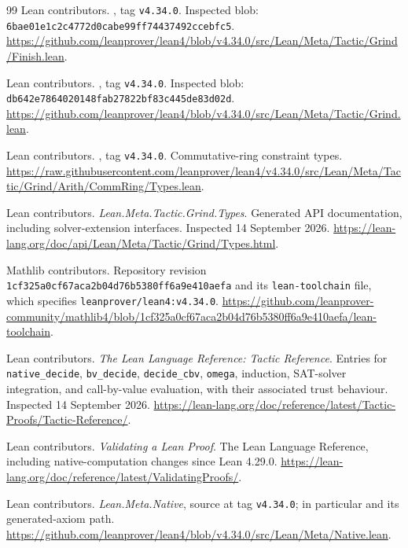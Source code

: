 \begin{thebibliography}{99}
Lean contributors. , tag
\texttt{v4.34.0}. Inspected blob:
\texttt{6bae01e1c2c4772d0cabe99ff74437492ccebfc5}.
\url{https://github.com/leanprover/lean4/blob/v4.34.0/src/Lean/Meta/Tactic/Grind/Finish.lean}.

Lean contributors. , tag
\texttt{v4.34.0}. Inspected blob:
\texttt{db642e7864020148fab27822bf83c445de83d02d}.
\url{https://github.com/leanprover/lean4/blob/v4.34.0/src/Lean/Meta/Tactic/Grind.lean}.

Lean contributors.
, tag
\texttt{v4.34.0}. Commutative-ring constraint types.
\url{https://raw.githubusercontent.com/leanprover/lean4/v4.34.0/src/Lean/Meta/Tactic/Grind/Arith/CommRing/Types.lean}.

Lean contributors. \emph{Lean.Meta.Tactic.Grind.Types}. Generated API
documentation, including solver-extension interfaces. Inspected
14 September 2026.
\url{https://lean-lang.org/doc/api/Lean/Meta/Tactic/Grind/Types.html}.

Mathlib contributors. Repository revision
\texttt{1cf325a0cf67aca2b04d76b5380ff6a9e410aefa} and its
\texttt{lean-toolchain} file, which specifies
\texttt{leanprover/lean4:v4.34.0}.
\url{https://github.com/leanprover-community/mathlib4/blob/1cf325a0cf67aca2b04d76b5380ff6a9e410aefa/lean-toolchain}.


Lean contributors. \emph{The Lean Language Reference: Tactic Reference}.
Entries for \texttt{native\_decide}, \texttt{bv\_decide}, \texttt{decide\_cbv},
\texttt{omega}, induction, SAT-solver integration, and call-by-value
evaluation, with their associated trust behaviour. Inspected
14 September 2026.
\url{https://lean-lang.org/doc/reference/latest/Tactic-Proofs/Tactic-Reference/}.

Lean contributors. \emph{Validating a Lean Proof}. The Lean Language
Reference, including native-computation changes since Lean 4.29.0.
\url{https://lean-lang.org/doc/reference/latest/ValidatingProofs/}.

Lean contributors. \emph{Lean.Meta.Native}, source at tag \texttt{v4.34.0};
in particular  and its generated-axiom path.
\url{https://github.com/leanprover/lean4/blob/v4.34.0/src/Lean/Meta/Native.lean}.


\end{thebibliography}
